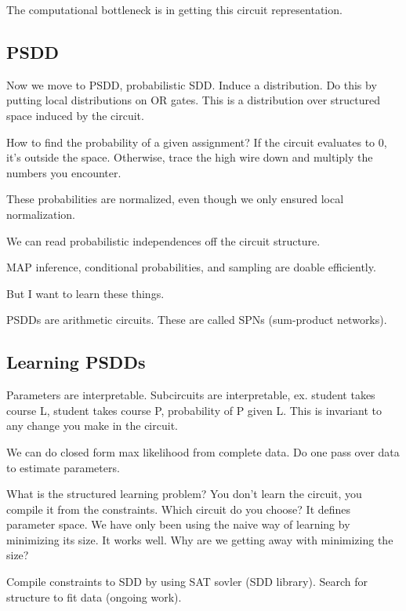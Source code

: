 The computational bottleneck is in getting this circuit representation.


\subsection{PSDD}

Now we move to PSDD, probabilistic SDD.
Induce a distribution. Do this by putting local distributions on OR gates. This is a distribution over structured space induced by the circuit.

How to find the probability of a given assignment? If the circuit evaluates to 0, it's outside the space. 
Otherwise, trace the high wire down and multiply the numbers you encounter.

These probabilities are normalized, even though we only ensured local normalization.

We can read probabilistic independences off the circuit structure.

MAP inference, conditional probabilities, and sampling are doable efficiently.

But I want to learn these things. 

PSDDs are arithmetic circuits. These are called SPNs (sum-product networks). 

\subsection{Learning PSDDs}


Parameters are interpretable. Subcircuits are interpretable, ex. student takes course L, student takes course P, probability of P given L. This is invariant to any change you make in the circuit.

We can do closed form max likelihood from complete data. Do one pass over data to estimate parameters.

What is the structured learning problem?
You don't learn the circuit, you compile it from the constraints. Which circuit do you choose? It defines parameter space. We have only been using the naive way of learning by minimizing its size. It works well. Why are we getting away with minimizing the size? 

Compile constraints to SDD by using SAT sovler (SDD library).  %
Search for structure to fit data (ongoing work).

